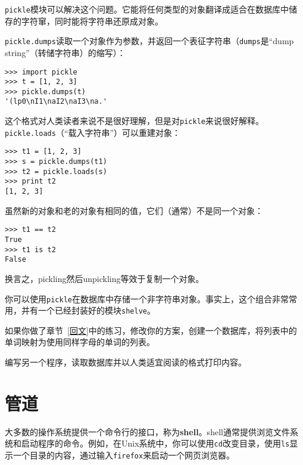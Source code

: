 
{\tt pickle}模块可以解决这个问题。它能将任何类型的对象翻译成适合在数据库中储存的字符窜，同时能将字符串还原成对象。

{\tt pickle.dumps}读取一个对象作为参数，并返回一个表征字符串（{\tt dumps}是“dump string”（转储字符串）的缩写）：

\beforeverb
\begin{verbatim}
>>> import pickle
>>> t = [1, 2, 3]
>>> pickle.dumps(t)
'(lp0\nI1\naI2\naI3\na.'
\end{verbatim}
\afterverb
%
这个格式对人类读者来说不是很好理解，但是对{\tt pickle}来说很好解释。{\tt pickle.loads}（“载入字符串”）可以重建对象：

\beforeverb
\begin{verbatim}
>>> t1 = [1, 2, 3]
>>> s = pickle.dumps(t1)
>>> t2 = pickle.loads(s)
>>> print t2
[1, 2, 3]
\end{verbatim}
\afterverb
%
虽然新的对象和老的对象有相同的值，它们（通常）不是同一个对象：

\beforeverb
\begin{verbatim}
>>> t1 == t2
True
>>> t1 is t2
False
\end{verbatim}
\afterverb
%
换言之，pickling然后unpickling等效于复制一个对象。

你可以使用{\tt pickle}在数据库中存储一个非字符串对象。事实上，这个组合非常常用，并有一个已经封装好的模块{\tt shelve}。



\begin{ex}


如果你做了章节~\ref{回文}中的练习，修改你的方案，创建一个数据库，将列表中的单词映射为使用同样字母的单词的列表。

编写另一个程序，读取数据库并以人类适宜阅读的格式打印内容。
\end{ex}


\section{管道}


大多数的操作系统提供一个命令行的接口，称为{\bf shell}。shell通常提供浏览文件系统和启动程序的命令。例如，在Unix系统中，你可以使用{\tt cd}改变目录，使用{\tt ls}显示一个目录的内容，通过输入{\tt firefox}来启动一个网页浏览器。

